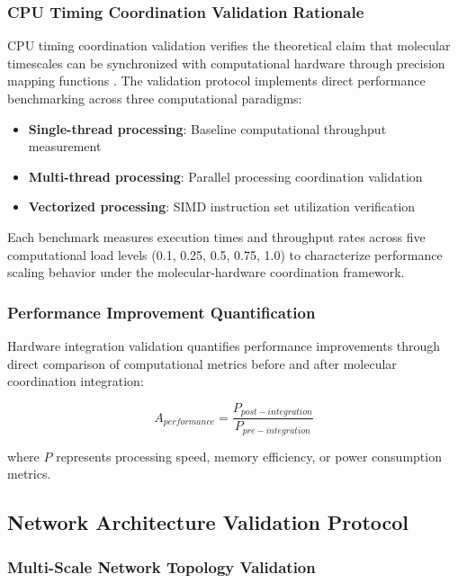 \subsubsection{CPU Timing Coordination Validation Rationale}

CPU timing coordination validation verifies the theoretical claim that molecular timescales can be synchronized with computational hardware through precision mapping functions \cite{hennessy2019computer}. The validation protocol implements direct performance benchmarking across three computational paradigms:

\begin{itemize}
\item \textbf{Single-thread processing}: Baseline computational throughput measurement
\item \textbf{Multi-thread processing}: Parallel processing coordination validation
\item \textbf{Vectorized processing}: SIMD instruction set utilization verification
\end{itemize}

Each benchmark measures execution times and throughput rates across five computational load levels (0.1, 0.25, 0.5, 0.75, 1.0) to characterize performance scaling behavior under the molecular-hardware coordination framework.

\subsubsection{Performance Improvement Quantification}

Hardware integration validation quantifies performance improvements through direct comparison of computational metrics before and after molecular coordination integration:

\begin{equation}
A_{performance} = \frac{P_{post-integration}}{P_{pre-integration}}
\end{equation}

where $P$ represents processing speed, memory efficiency, or power consumption metrics.

\subsection{Network Architecture Validation Protocol}

\subsubsection{Multi-Scale Network Topology Validation}

